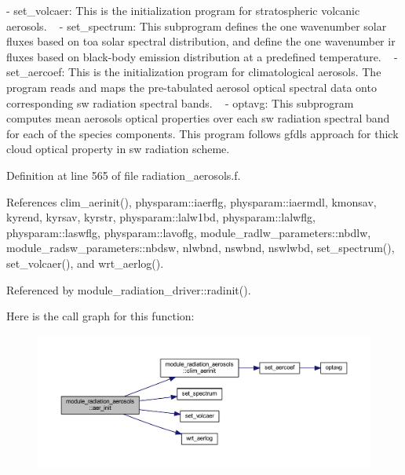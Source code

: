  -\/ set\+\_\+volcaer\+: This is the initialization program for stratospheric volcanic aerosols. ~\newline
 -\/ set\+\_\+spectrum\+: This subprogram defines the one wavenumber solar fluxes based on toa solar spectral distribution, and define the one wavenumber ir fluxes based on black-\/body emission distribution at a predefined temperature. ~\newline
 -\/ set\+\_\+aercoef\+: This is the initialization program for climatological aerosols. The program reads and maps the pre-\/tabulated aerosol optical spectral data onto corresponding sw radiation spectral bands. ~\newline
 -\/ optavg\+: This subprogram computes mean aerosols optical properties over each sw radiation spectral band for each of the species components. This program follows gfdl\textquotesingle{}s approach for thick cloud optical property in sw radiation scheme. 

Definition at line 565 of file radiation\+\_\+aerosols.\+f.



References clim\+\_\+aerinit(), physparam\+::iaerflg, physparam\+::iaermdl, kmonsav, kyrend, kyrsav, kyrstr, physparam\+::lalw1bd, physparam\+::lalwflg, physparam\+::laswflg, physparam\+::lavoflg, module\+\_\+radlw\+\_\+parameters\+::nbdlw, module\+\_\+radsw\+\_\+parameters\+::nbdsw, nlwbnd, nswbnd, nswlwbd, set\+\_\+spectrum(), set\+\_\+volcaer(), and wrt\+\_\+aerlog().



Referenced by module\+\_\+radiation\+\_\+driver\+::radinit().



Here is the call graph for this function\+:
\nopagebreak
\begin{figure}[H]
\begin{center}
\leavevmode
\includegraphics[width=350pt]{namespacemodule__radiation__aerosols_a6086afe5183a09ca64810af7fe2a12ac_cgraph}
\end{center}
\end{figure}




